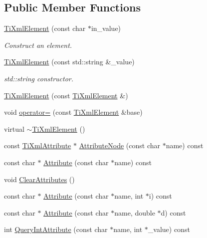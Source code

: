 \subsection*{Public Member Functions}
\begin{DoxyCompactItemize}
\item 
\hyperlink{class_ti_xml_element_a01bc3ab372d35da08efcbbe65ad90c60}{Ti\+Xml\+Element} (const char $\ast$in\+\_\+value)
\begin{DoxyCompactList}\small\item\em Construct an element. \end{DoxyCompactList}\item 
\hyperlink{class_ti_xml_element_a40fc2e3c1a955e2f78e1a32350d180e7}{Ti\+Xml\+Element} (const std\+::string \&\+\_\+value)
\begin{DoxyCompactList}\small\item\em std\+::string constructor. \end{DoxyCompactList}\item 
\hyperlink{class_ti_xml_element_a1ca4465f3c2eac6a60e641cd7f1d9f7e}{Ti\+Xml\+Element} (const \hyperlink{class_ti_xml_element}{Ti\+Xml\+Element} \&)
\item 
void \hyperlink{class_ti_xml_element_af5cd4156e082ef3bf23adfe0ed173340}{operator=} (const \hyperlink{class_ti_xml_element}{Ti\+Xml\+Element} \&base)
\item 
virtual \hyperlink{class_ti_xml_element_aa049a47c5081c0d021968666360da261}{$\sim$\+Ti\+Xml\+Element} ()
\item 
const \hyperlink{class_ti_xml_attribute}{Ti\+Xml\+Attribute} $\ast$ \hyperlink{class_ti_xml_element_a6f8673586bc8063e838b89cf9dc6891f}{Attribute\+Node} (const char $\ast$name) const
\item 
const char $\ast$ \hyperlink{class_ti_xml_element_a6042f518748f475a7ac4b4e0b509eb05}{Attribute} (const char $\ast$name) const
\item 
void \hyperlink{class_ti_xml_element_a11ad3e12a953d9b9aaae7625bf872a7a}{Clear\+Attributes} ()
\item 
const char $\ast$ \hyperlink{class_ti_xml_element_a8005d0b808fd02bd1246710cdf95e5f6}{Attribute} (const char $\ast$name, int $\ast$i) const
\item 
const char $\ast$ \hyperlink{class_ti_xml_element_a09df893402d0ab1402c8725e6d30ec04}{Attribute} (const char $\ast$name, double $\ast$d) const
\item 
int \hyperlink{class_ti_xml_element_a5c0f739e0f6f5905a201364532e54a60}{Query\+Int\+Attribute} (const char $\ast$name, int $\ast$\+\_\+value) const

\end{DoxyCompactItemize}
